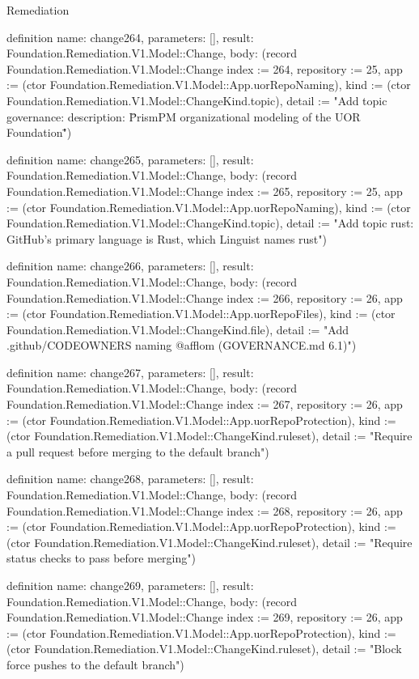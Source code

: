 \begin{lexlean}{Remediation}
\begin{semanticmodule}
definition{
  name: change264,
  parameters: [],
  result: Foundation.Remediation.V1.Model::Change,
  body: (record Foundation.Remediation.V1.Model::Change {index := 264, repository := 25, app := (ctor Foundation.Remediation.V1.Model::App.uorRepoNaming), kind := (ctor Foundation.Remediation.V1.Model::ChangeKind.topic), detail := "Add topic governance: description: \"PrismPM organizational modeling of the UOR Foundation\""})
}

definition{
  name: change265,
  parameters: [],
  result: Foundation.Remediation.V1.Model::Change,
  body: (record Foundation.Remediation.V1.Model::Change {index := 265, repository := 25, app := (ctor Foundation.Remediation.V1.Model::App.uorRepoNaming), kind := (ctor Foundation.Remediation.V1.Model::ChangeKind.topic), detail := "Add topic rust: GitHub's primary language is Rust, which Linguist names rust"})
}

definition{
  name: change266,
  parameters: [],
  result: Foundation.Remediation.V1.Model::Change,
  body: (record Foundation.Remediation.V1.Model::Change {index := 266, repository := 26, app := (ctor Foundation.Remediation.V1.Model::App.uorRepoFiles), kind := (ctor Foundation.Remediation.V1.Model::ChangeKind.file), detail := "Add .github/CODEOWNERS naming @afflom (GOVERNANCE.md 6.1)"})
}

definition{
  name: change267,
  parameters: [],
  result: Foundation.Remediation.V1.Model::Change,
  body: (record Foundation.Remediation.V1.Model::Change {index := 267, repository := 26, app := (ctor Foundation.Remediation.V1.Model::App.uorRepoProtection), kind := (ctor Foundation.Remediation.V1.Model::ChangeKind.ruleset), detail := "Require a pull request before merging to the default branch"})
}

definition{
  name: change268,
  parameters: [],
  result: Foundation.Remediation.V1.Model::Change,
  body: (record Foundation.Remediation.V1.Model::Change {index := 268, repository := 26, app := (ctor Foundation.Remediation.V1.Model::App.uorRepoProtection), kind := (ctor Foundation.Remediation.V1.Model::ChangeKind.ruleset), detail := "Require status checks to pass before merging"})
}

definition{
  name: change269,
  parameters: [],
  result: Foundation.Remediation.V1.Model::Change,
  body: (record Foundation.Remediation.V1.Model::Change {index := 269, repository := 26, app := (ctor Foundation.Remediation.V1.Model::App.uorRepoProtection), kind := (ctor Foundation.Remediation.V1.Model::ChangeKind.ruleset), detail := "Block force pushes to the default branch"})
}


\end{semanticmodule}
\end{lexlean}

